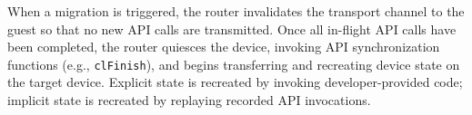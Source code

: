 When a migration is triggered, the router invalidates the transport channel to the guest so that no new API calls are transmitted. Once all in-flight API calls have been completed, the router quiesces the device, invoking API synchronization functions (e.g., \lstinline|clFinish|), and begins transferring and recreating device state on the target device.
Explicit state is recreated by invoking developer-provided code; implicit state is recreated by replaying recorded API invocations.


\begin{comment}
\aak{commented this out because it's an important limitation but too in the weeds}
Because the hypervisor waits for in-fight API invocations to be completed before migration, a potential challenge arises for invocations that take a long time (e.g., an application using persistent threads~\cite{persistent-threads}).
\AvA could provide a method to abort such invocations, which, combined with \AvA's record-replay approach, ensures that device state can be restored to match the state before the invocation.
However, rolling host application state back to match that pre-invocation GPU state requires frequent checkpointing that \AvA does not yet implement.
We leave this challenge for future work, but observe that compared to current solutions which provide \emph{no} support for VM migration for GPGPU applications, \AvA provides a compelling level of support.
\end{comment}




